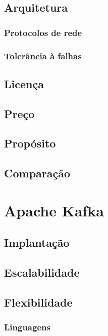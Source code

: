 \subsection{Arquitetura}

\subsubsection{Protocolos de rede}

\subsubsection{Tolerância à falhas}

\subsection{Licença}

\subsection{Preço}

\subsection{Propósito}

\subsection{Comparação}

\section{Apache Kafka}

\subsection{Implantação}

\subsection{Escalabilidade}

\subsection{Flexibilidade}

\subsubsection{Linguagens}
